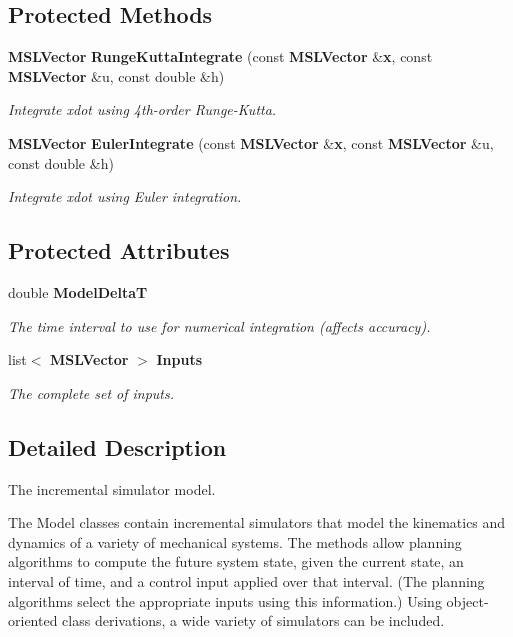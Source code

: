 \subsection*{Protected Methods}
\begin{CompactItemize}
\item 
{\bf MSLVector} {\bf Runge\-Kutta\-Integrate} (const {\bf MSLVector} \&{\bf x}, const {\bf MSLVector} \&u, const double \&h)
\begin{CompactList}\small\item\em Integrate xdot using 4th-order Runge-Kutta.\item\end{CompactList}\item 
{\bf MSLVector} {\bf Euler\-Integrate} (const {\bf MSLVector} \&{\bf x}, const {\bf MSLVector} \&u, const double \&h)
\begin{CompactList}\small\item\em Integrate xdot using Euler integration.\item\end{CompactList}\end{CompactItemize}
\subsection*{Protected Attributes}
\begin{CompactItemize}
\item 
double {\bf Model\-Delta\-T}
\begin{CompactList}\small\item\em The time interval to use for numerical integration (affects accuracy).\item\end{CompactList}\item 
list$<$ {\bf MSLVector} $>$ {\bf Inputs}
\begin{CompactList}\small\item\em The complete set of inputs.\item\end{CompactList}\end{CompactItemize}


\subsection{Detailed Description}
The incremental simulator model.

The Model classes contain incremental simulators that model the kinematics and dynamics of a variety of mechanical systems. The methods allow planning algorithms to compute the future system state, given the current state, an interval of time, and a control input applied over that interval. (The planning algorithms select the appropriate inputs using this information.) Using object-oriented class derivations, a wide variety of simulators can be included. 



